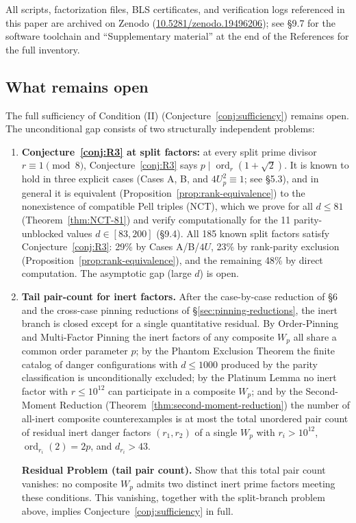 \documentclass[12pt]{article}
\theoremstyle{plain}
\theoremstyle{definition}
\theoremstyle{remark}
\begin{document}
All scripts, factorization files, BLS certificates, and verification
logs referenced in this paper are archived on Zenodo
(\href{https://doi.org/10.5281/zenodo.19496206}{10.5281/zenodo.19496206});
see \S9.7 for the software toolchain and ``Supplementary material''
at the end of the References for the full inventory.

\subsection{What remains open}


The full sufficiency of Condition (II) (Conjecture~\ref{conj:sufficiency}) remains open.
The unconditional gap consists of two structurally independent problems:

\begin{enumerate}
\item \textbf{Conjecture~\ref{conj:R3} at split factors:} at every split prime divisor
  \(r \equiv 1 \pmod 8\), Conjecture~\ref{conj:R3} says
  \(p \mid \operatorname{ord}_r(1+\sqrt 2)\). It is known to hold
  in three explicit cases (Cases A, B, and \(4U_p^2 \equiv 1\); see
  \S5.3), and in general it is equivalent (Proposition~\ref{prop:rank-equivalence}) to the
  nonexistence of compatible Pell triples (NCT), which we prove for
  all \(d \leq 81\) (Theorem~\ref{thm:NCT-81}) and verify computationally
  for the 11 parity-unblocked values \(d \in [83, 200]\) (\S9.4).
  All 185 known split factors satisfy Conjecture~\ref{conj:R3}: 29\%
  by Cases A/B/\(4U\), 23\% by rank-parity exclusion
  (Proposition~\ref{prop:rank-equivalence}), and the remaining 48\% by
  direct computation.
  The asymptotic gap (large \(d\)) is open.
\item \textbf{Tail pair-count for inert factors.} After the
  case-by-case reduction of \S6 and the cross-case pinning
  reductions of \S\ref{sec:pinning-reductions}, the inert branch is
  closed except for a single quantitative residual. By
  Order-Pinning and Multi-Factor Pinning the inert factors of any
  composite \(W_p\) all share a common order parameter \(p\); by
  the Phantom Exclusion Theorem the finite catalog of danger
  configurations with \(d \leq 1000\) produced by the parity
  classification is unconditionally excluded; by the Platinum
  Lemma no inert factor with \(r \leq 10^{12}\) can participate in
  a composite \(W_p\); and by the Second-Moment Reduction
  (Theorem~\ref{thm:second-moment-reduction}) the number of
  all-inert composite counterexamples is at most the total
  unordered pair count of residual inert danger factors
  \((r_1, r_2)\) of a single \(W_p\) with
  \(r_i > 10^{12}\), \(\operatorname{ord}_{r_i}(2) = 2p\), and
  \(d_{r_i} > 43\).

  \textbf{Residual Problem (tail pair count).} Show that this
  total pair count vanishes: no composite \(W_p\) admits two
  distinct inert prime factors meeting these conditions. This
  vanishing, together with the split-branch problem above, implies
  Conjecture~\ref{conj:sufficiency} in full.
\end{enumerate}
\end{document}
